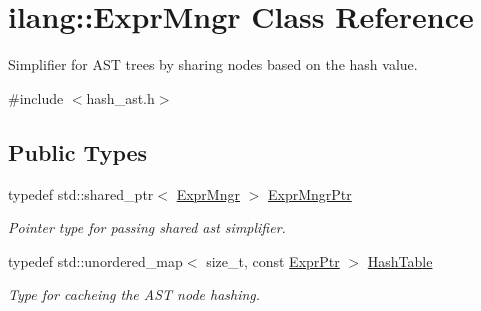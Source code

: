 \hypertarget{classilang_1_1_expr_mngr}{}\section{ilang\+:\+:Expr\+Mngr Class Reference}
\label{classilang_1_1_expr_mngr}


Simplifier for A\+ST trees by sharing nodes based on the hash value.  




{\ttfamily \#include $<$hash\+\_\+ast.\+h$>$}

\subsection*{Public Types}
\begin{DoxyCompactItemize}
\item 
\mbox{\label{classilang_1_1_expr_mngr_ad35ebf0cecad6f10877667b766bdfac1}} 
typedef std\+::shared\+\_\+ptr$<$ \mbox{\hyperlink{classilang_1_1_expr_mngr}{Expr\+Mngr}} $>$ \mbox{\hyperlink{classilang_1_1_expr_mngr_ad35ebf0cecad6f10877667b766bdfac1}{Expr\+Mngr\+Ptr}}
\begin{DoxyCompactList}\small\item\em Pointer type for passing shared ast simplifier. \end{DoxyCompactList}\item 
\mbox{\label{classilang_1_1_expr_mngr_a7ea331492ead4c6dbd3c6b1104deb92c}} 
typedef std\+::unordered\+\_\+map$<$ size\+\_\+t, const \mbox{\hyperlink{namespaceilang_a7c4196c72e53ea4df4b7861af7bc3bce}{Expr\+Ptr}} $>$ \mbox{\hyperlink{classilang_1_1_expr_mngr_a7ea331492ead4c6dbd3c6b1104deb92c}{Hash\+Table}}
\begin{DoxyCompactList}\small\item\em Type for cacheing the A\+ST node hashing. \end{DoxyCompactList}\end{DoxyCompactItemize}
